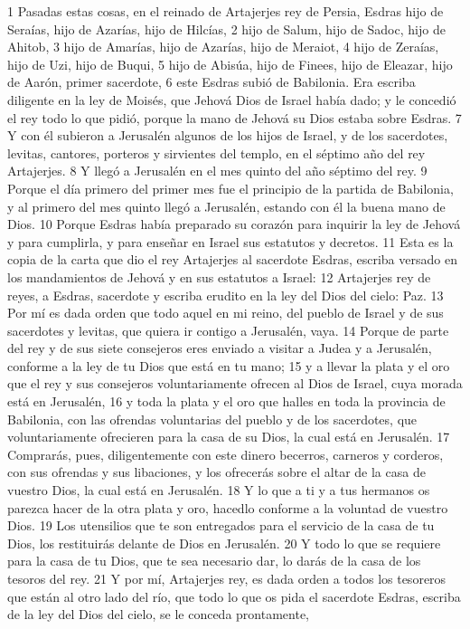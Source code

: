 1 Pasadas estas cosas, en el reinado de Artajerjes rey de Persia, Esdras hijo de Seraías, hijo de Azarías, hijo de Hilcías,
2 hijo de Salum, hijo de Sadoc, hijo de Ahitob,
3 hijo de Amarías, hijo de Azarías, hijo de Meraiot,
4 hijo de Zeraías, hijo de Uzi, hijo de Buqui,
5 hijo de Abisúa, hijo de Finees, hijo de Eleazar, hijo de Aarón, primer sacerdote,
6 este Esdras subió de Babilonia. Era escriba diligente en la ley de Moisés, que Jehová Dios de Israel había dado; y le concedió el rey todo lo que pidió, porque la mano de Jehová su Dios estaba sobre Esdras.
7 Y con él subieron a Jerusalén algunos de los hijos de Israel, y de los sacerdotes, levitas, cantores, porteros y sirvientes del templo, en el séptimo año del rey Artajerjes.
8 Y llegó a Jerusalén en el mes quinto del año séptimo del rey.
9 Porque el día primero del primer mes fue el principio de la partida de Babilonia, y al primero del mes quinto llegó a Jerusalén, estando con él la buena mano de Dios.
10 Porque Esdras había preparado su corazón para inquirir la ley de Jehová y para cumplirla, y para enseñar en Israel sus estatutos y decretos.
11 Esta es la copia de la carta que dio el rey Artajerjes al sacerdote Esdras, escriba versado en los mandamientos de Jehová y en sus estatutos a Israel:
12 Artajerjes rey de reyes, a Esdras, sacerdote y escriba erudito en la ley del Dios del cielo: Paz.
13 Por mí es dada orden que todo aquel en mi reino, del pueblo de Israel y de sus sacerdotes y levitas, que quiera ir contigo a Jerusalén, vaya.
14 Porque de parte del rey y de sus siete consejeros eres enviado a visitar a Judea y a Jerusalén, conforme a la ley de tu Dios que está en tu mano;
15 y a llevar la plata y el oro que el rey y sus consejeros voluntariamente ofrecen al Dios de Israel, cuya morada está en Jerusalén,
16 y toda la plata y el oro que halles en toda la provincia de Babilonia, con las ofrendas voluntarias del pueblo y de los sacerdotes, que voluntariamente ofrecieren para la casa de su Dios, la cual está en Jerusalén.
17 Comprarás, pues, diligentemente con este dinero becerros, carneros y corderos, con sus ofrendas y sus libaciones, y los ofrecerás sobre el altar de la casa de vuestro Dios, la cual está en Jerusalén.
18 Y lo que a ti y a tus hermanos os parezca hacer de la otra plata y oro, hacedlo conforme a la voluntad de vuestro Dios.
19 Los utensilios que te son entregados para el servicio de la casa de tu Dios, los restituirás delante de Dios en Jerusalén.
20 Y todo lo que se requiere para la casa de tu Dios, que te sea necesario dar, lo darás de la casa de los tesoros del rey.
21 Y por mí, Artajerjes rey, es dada orden a todos los tesoreros que están al otro lado del río, que todo lo que os pida el sacerdote Esdras, escriba de la ley del Dios del cielo, se le conceda prontamente,
